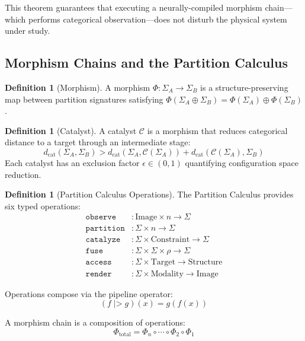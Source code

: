 \documentclass[11pt,twocolumn,a4paper]{article}
\theoremstyle{definition}
\newtheorem{definition}[theorem]{Definition}
\theoremstyle{remark}
\newcommand{\dcat}{d_{\mathrm{cat}}}
\newcommand{\Sig}{\Sigma}
\newcommand{\morphism}{\Phi}
\newcommand{\catalyst}{\mathcal{C}}
\begin{document}
This theorem guarantees that executing a neurally-compiled morphism chain---which performs categorical observation---does not disturb the physical system under study.

\subsection{Morphism Chains and the Partition Calculus}

\begin{definition}[Morphism]
A morphism $\morphism: \Sig_A \to \Sig_B$ is a structure-preserving map between partition signatures satisfying $\morphism(\Sig_A \oplus \Sig_B) = \morphism(\Sig_A) \oplus \morphism(\Sig_B)$.
\end{definition}

\begin{definition}[Catalyst]
A catalyst $\catalyst$ is a morphism that reduces categorical distance to a target through an intermediate stage:
\begin{equation}
\dcat(\Sig_A, \Sig_B) > \dcat(\Sig_A, \catalyst(\Sig_A)) + \dcat(\catalyst(\Sig_A), \Sig_B)
\end{equation}
Each catalyst has an exclusion factor $\epsilon \in (0,1)$ quantifying configuration space reduction.
\end{definition}

\begin{definition}[Partition Calculus Operations]
\label{def:operations}
The Partition Calculus provides six typed operations:
\begin{align}
\texttt{observe} &: \mathrm{Image} \times n \to \Sig \\
\texttt{partition} &: \Sig \times n \to \Sig \\
\texttt{catalyze} &: \Sig \times \mathrm{Constraint} \to \Sig \\
\texttt{fuse} &: \Sig \times \Sig \times \rho \to \Sig \\
\texttt{access} &: \Sig \times \mathrm{Target} \to \mathrm{Structure} \\
\texttt{render} &: \Sig \times \mathrm{Modality} \to \mathrm{Image}
\end{align}
\end{definition}

Operations compose via the pipeline operator:
\begin{equation}
(f \; \texttt{|>} \; g)(x) = g(f(x))
\end{equation}

A morphism chain is a composition of operations:
\begin{equation}
\morphism_{\mathrm{total}} = \morphism_n \circ \cdots \circ \morphism_2 \circ \morphism_1
\end{equation}
\end{document}
